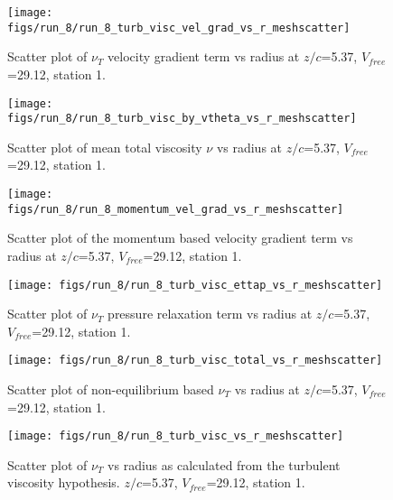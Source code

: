 \begin{figure}[H]
\centering
\texttt{[image: figs/run\_8/run\_8\_turb\_visc\_vel\_grad\_vs\_r\_meshscatter]}
\caption{Scatter plot of $\nu_T$ velocity gradient term vs radius at $z/c$=5.37, $V_{free}$=29.12, station 1.}
\end{figure}


\begin{figure}[H]
\centering
\texttt{[image: figs/run\_8/run\_8\_turb\_visc\_by\_vtheta\_vs\_r\_meshscatter]}
\caption{Scatter plot of mean total viscosity $\nu$ vs radius at $z/c$=5.37, $V_{free}$=29.12, station 1.}
\end{figure}


\begin{figure}[H]
\centering
\texttt{[image: figs/run\_8/run\_8\_momentum\_vel\_grad\_vs\_r\_meshscatter]}
\caption{Scatter plot of the momentum based velocity gradient term vs radius at $z/c$=5.37, $V_{free}$=29.12, station 1.}
\end{figure}


\begin{figure}[H]
\centering
\texttt{[image: figs/run\_8/run\_8\_turb\_visc\_ettap\_vs\_r\_meshscatter]}
\caption{Scatter plot of $\nu_T$ pressure relaxation term vs radius at $z/c$=5.37, $V_{free}$=29.12, station 1.}
\end{figure}


\begin{figure}[H]
\centering
\texttt{[image: figs/run\_8/run\_8\_turb\_visc\_total\_vs\_r\_meshscatter]}
\caption{Scatter plot of non-equilibrium based $\nu_T$ vs radius at $z/c$=5.37, $V_{free}$=29.12, station 1.}
\end{figure}


\begin{figure}[H]
\centering
\texttt{[image: figs/run\_8/run\_8\_turb\_visc\_vs\_r\_meshscatter]}
\caption{Scatter plot of $\nu_T$ vs radius as calculated from the turbulent viscosity hypothesis. $z/c$=5.37, $V_{free}$=29.12, station 1.}
\end{figure}


